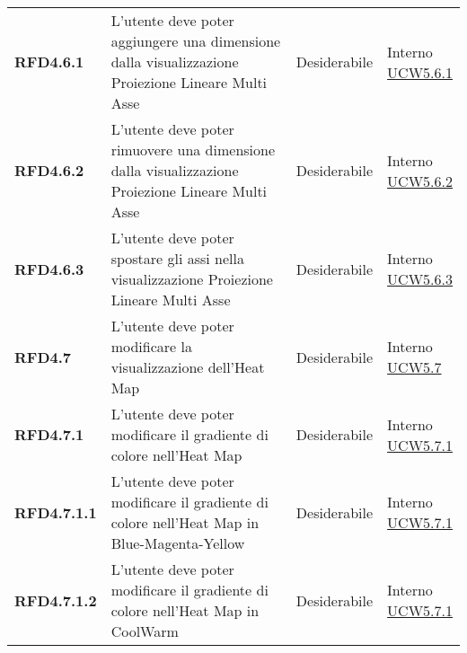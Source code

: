 \begin{longtable}[H]{| >{\raggedright\bfseries}m{20mm} | >{\raggedright}m{90mm} | >{\centering}m{25mm} | >{\centering\arraybackslash}m{30mm}|}
    RFD4.6.1
     & L'utente deve poter aggiungere una dimensione dalla visualizzazione Proiezione Lineare Multi Asse
     & Desiderabile
     & \makecell{ Interno                                                                                                \\  \hyperref[par:ucw5.6.1]{UCW5.6.1} }\\

    RFD4.6.2
     & L'utente deve poter rimuovere una dimensione dalla visualizzazione Proiezione Lineare Multi Asse
     & Desiderabile
     & \makecell{ Interno                                                                                                \\  \hyperref[par:ucw5.6.2]{UCW5.6.2} }\\

    RFD4.6.3
     & L'utente deve poter spostare gli assi nella visualizzazione Proiezione Lineare Multi Asse
     & Desiderabile
     & \makecell{ Interno                                                                                                \\  \hyperref[par:ucw5.6.3]{UCW5.6.3} }\\

    RFD4.7
     & L'utente deve poter modificare la visualizzazione dell'Heat Map
     & Desiderabile
     & \makecell{ Interno                                                                                                \\  \hyperref[ssub:ucw5.7]{UCW5.7} }\\

    RFD4.7.1
     & L'utente deve poter modificare il gradiente di colore nell'Heat Map
     & Desiderabile
     & \makecell{ Interno                                                                                                \\  \hyperref[par:ucw5.7.1]{UCW5.7.1} }\\

    RFD4.7.1.1
     & L'utente deve poter modificare il gradiente di colore nell'Heat Map in Blue-Magenta-Yellow
     & Desiderabile
     & \makecell{ Interno                                                                                                \\  \hyperref[par:ucw5.7.1]{UCW5.7.1} }\\

    RFD4.7.1.2
     & L'utente deve poter modificare il gradiente di colore nell'Heat Map in CoolWarm
     & Desiderabile
     & \makecell{ Interno                                                                                                \\  \hyperref[par:ucw5.7.1]{UCW5.7.1} }\\


\end{longtable}
